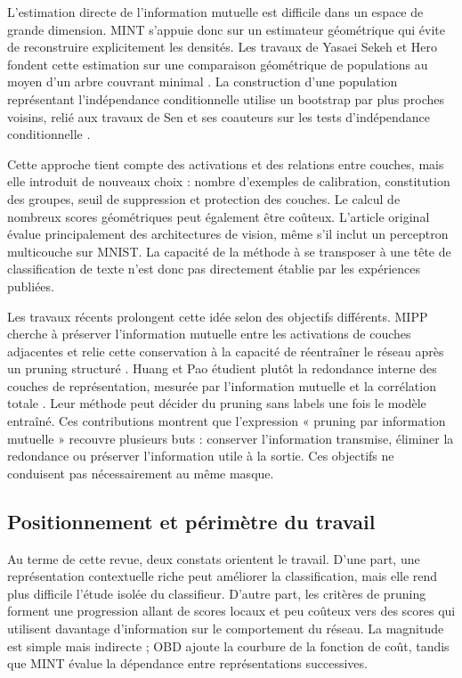 L'estimation directe de l'information mutuelle est difficile dans un espace de
grande dimension. MINT s'appuie donc sur un estimateur géométrique qui évite de
reconstruire explicitement les densités. Les travaux de Yasaei Sekeh et Hero
fondent cette estimation sur une comparaison géométrique de populations au
moyen d'un arbre couvrant minimal \cite{yasaei2019gmi}. La construction d'une
population représentant l'indépendance conditionnelle utilise un bootstrap par
plus proches voisins, relié aux travaux de Sen et ses coauteurs sur les tests
d'indépendance conditionnelle \cite{sen2017ci}.

Cette approche tient compte des activations et des relations entre couches,
mais elle introduit de nouveaux choix : nombre d'exemples de calibration,
constitution des groupes, seuil de suppression et protection des couches. Le
calcul de nombreux scores géométriques peut également être coûteux. L'article
original évalue principalement des architectures de vision, même s'il inclut
un perceptron multicouche sur MNIST. La capacité de la méthode à se transposer à
une tête de classification de texte n'est donc pas directement établie par les
expériences publiées.

Les travaux récents prolongent cette idée selon des objectifs différents. MIPP
cherche à préserver l'information mutuelle entre les activations de couches
adjacentes et relie cette conservation à la capacité de réentraîner le réseau
après un pruning structuré \cite{westphal2025mipp}. Huang et Pao étudient plutôt
la redondance interne des couches de représentation, mesurée par
l'information mutuelle et la corrélation totale
\cite{huang2025interpretable}. Leur méthode peut décider du pruning sans labels
une fois le modèle entraîné. Ces contributions montrent que l'expression
« pruning par information mutuelle » recouvre plusieurs buts : conserver
l'information transmise, éliminer la redondance ou préserver l'information
utile à la sortie. Ces objectifs ne conduisent pas nécessairement au même
masque.

\subsection{Positionnement et périmètre du travail}
\label{ssec:etat_art_positionnement}

Au terme de cette revue, deux constats orientent le travail. D'une part, une
représentation contextuelle riche peut améliorer la classification, mais elle
rend plus difficile l'étude isolée du classifieur. D'autre part, les critères de
pruning forment une progression allant de scores locaux et peu coûteux vers des
scores qui utilisent davantage d'information sur le comportement du réseau. La
magnitude est simple mais indirecte ; OBD ajoute la courbure de la fonction de
coût, tandis que MINT évalue la dépendance entre représentations successives.

